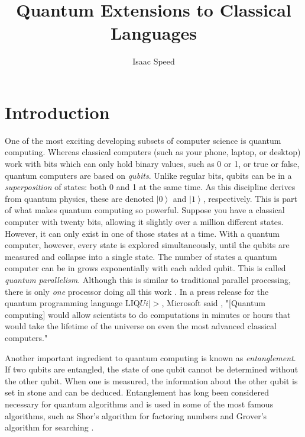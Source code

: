 \documentclass[]{article}
\title{Quantum Extensions to Classical Languages}
\author{Isaac Speed}
\newcommand{\ket}[1]{\left|#1\right\rangle}
\begin{document}
	

\maketitle

\begin{abstract}

\end{abstract}

\section{Introduction}
One of the most exciting developing subsets of computer science is quantum computing. Whereas classical computers (such as your phone, laptop, or desktop) work with bits which can only hold binary values, such as 0 or 1, or true or false, quantum computers are based on \textit{qubits}. Unlike regular bits, qubits can be in a \textit{superposition} of states: both 0 and 1 at the same time. As this discipline derives from quantum physics, these are denoted $\ket{0}$ and $\ket{1}$, respectively. This is part of what makes quantum computing so powerful. Suppose you have a classical computer with twenty bits, allowing it slightly over a million different states. However, it can only exist in one of those states at a time. With a quantum computer, however, every state is explored simultaneously, until the qubits are measured and collapse into a single state. The number of states a quantum computer can be in grows exponentially with each added qubit. This is called \textit{quantum parallelism}. Although this is similar to traditional parallel processing, there is only \textit{one} processor doing all this work \cite{ambainis_2014}. In a press release for the quantum programming language LIQ$Ui|>$, Microsoft said \cite{dent_2017}, "[Quantum computing] would allow scientists to do computations in minutes or hours that would take the lifetime of the universe on even the most advanced classical computers."

Another important ingredient to quantum computing is known as \textit{entanglement}. If two qubits are entangled, the state of one qubit cannot be determined without the other qubit. When one is measured, the information about the other qubit is set in stone and can be deduced. Entanglement has long been considered necessary for quantum algorithms and is used in some of the most famous algorithms, such as Shor's algorithm for factoring numbers and Grover's algorithm for searching \cite{shor1995}.
\end{document}
